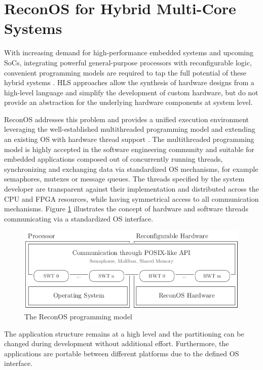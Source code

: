 \section{ReconOS for Hybrid Multi-Core Systems}
With increasing demand for high-performance embedded systems and upcoming
\acp{SoC}, integrating powerful general-purpose processors with reconfigurable
logic, convenient programming models are required to tap the full potential of
these hybrid systems \citep{ANA04,VMB13}. \ac{HLS} approaches allow the
synthesis of hardware designs from a high-level language and simplify the
development of custom hardware, but do not provide an abstraction for the
underlying hardware components at system level.

ReconOS addresses this problem and provides a unified execution environment
leveraging the well-established multithreaded programming model and extending
an existing \ac{OS} with hardware thread support \citep{AHK14}. The
multithreaded programming model is highly accepted in the software engineering
community and suitable for embedded applications \citep{ANA04} composed out of
concurrently running threads, synchronizing and exchanging data via
standardized \ac{OS} mechanisms, for example semaphores, mutexes or message
queues. The threads specified by the system developer are transparent against
their implementation and distributed across the \ac{CPU} and \ac{FPGA}
resources, while having symmetrical access to all communication mechanisms.
Figure \ref{fig:reconos_model} illustrates the concept of hardware and
software threads communicating via a standardized \ac{OS} interface.
\begin{figure}[tb]
	\centering
	\includegraphics{../figures/reconos_model}
	\caption{The ReconOS programming model}
	\label{fig:reconos_model}
\end{figure}
The application structure remains at a high level and the partitioning can be
changed during development without additional effort. Furthermore, the
applications are portable between different platforms due to the defined
\ac{OS} interface.


